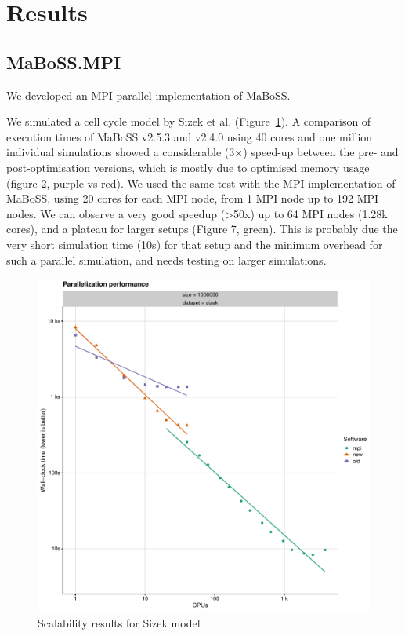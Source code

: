 \documentclass[times, twoside]{zHenriquesLab-StyleBioRxiv}
\begin{document}
\section*{Results}

\subsection*{MaBoSS.MPI}
We developed an MPI parallel implementation of MaBoSS. 

We simulated a cell cycle model by Sizek et al.\cite{sizek2019boolean} (Figure~\ref{fig:sizek_results}). A comparison of execution times of MaBoSS v2.5.3 and v2.4.0 using 40 cores and one million individual simulations showed a considerable (3×) speed-up between the pre- and post-optimisation versions, which is mostly due to optimised memory usage (figure 2, purple vs red). We used the same test with the MPI implementation of MaBoSS, using 20 cores for each MPI node, from 1 MPI node up to 192 MPI nodes. We can observe a very good speedup (>50x) up to 64 MPI nodes (1.28k cores), and a plateau for larger setups (Figure 7, green). This is probably due the very short simulation time (10s) for that setup and the minimum overhead for such a parallel simulation, and needs testing on larger simulations.


\begin{figure}%
\centering
\includegraphics[width=.8\linewidth]{Figures/sizek_model.pdf}
\caption{Scalability results for Sizek model}
\label{fig:sizek_results}
\end{figure}
\end{document}
